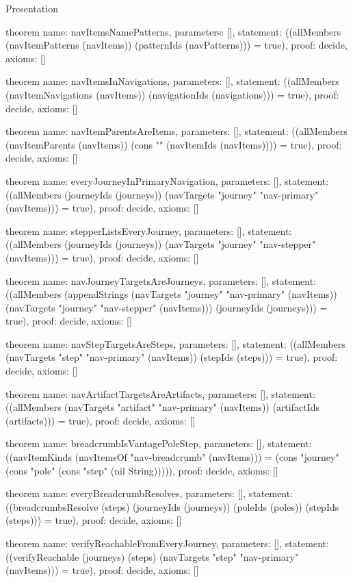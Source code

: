 \begin{lexlean}{Presentation}
\begin{semanticmodule}
theorem{
  name: navItemsNamePatterns,
  parameters: [],
  statement: ((allMembers (navItemPatterns (navItems)) (patternIds (navPatterns))) = true),
  proof: decide{},
  axioms: []
}

theorem{
  name: navItemsInNavigations,
  parameters: [],
  statement: ((allMembers (navItemNavigations (navItems)) (navigationIds (navigations))) = true),
  proof: decide{},
  axioms: []
}

theorem{
  name: navItemParentsAreItems,
  parameters: [],
  statement: ((allMembers (navItemParents (navItems)) (cons "" (navItemIds (navItems)))) = true),
  proof: decide{},
  axioms: []
}

theorem{
  name: everyJourneyInPrimaryNavigation,
  parameters: [],
  statement: ((allMembers (journeyIds (journeys)) (navTargets "journey" "nav-primary" (navItems))) = true),
  proof: decide{},
  axioms: []
}

theorem{
  name: stepperListsEveryJourney,
  parameters: [],
  statement: ((allMembers (journeyIds (journeys)) (navTargets "journey" "nav-stepper" (navItems))) = true),
  proof: decide{},
  axioms: []
}

theorem{
  name: navJourneyTargetsAreJourneys,
  parameters: [],
  statement: ((allMembers (appendStrings (navTargets "journey" "nav-primary" (navItems)) (navTargets "journey" "nav-stepper" (navItems))) (journeyIds (journeys))) = true),
  proof: decide{},
  axioms: []
}

theorem{
  name: navStepTargetsAreSteps,
  parameters: [],
  statement: ((allMembers (navTargets "step" "nav-primary" (navItems)) (stepIds (steps))) = true),
  proof: decide{},
  axioms: []
}

theorem{
  name: navArtifactTargetsAreArtifacts,
  parameters: [],
  statement: ((allMembers (navTargets "artifact" "nav-primary" (navItems)) (artifactIds (artifacts))) = true),
  proof: decide{},
  axioms: []
}

theorem{
  name: breadcrumbIsVantagePoleStep,
  parameters: [],
  statement: ((navItemKinds (navItemsOf "nav-breadcrumb" (navItems))) = (cons "journey" (cons "pole" (cons "step" (nil String))))),
  proof: decide{},
  axioms: []
}

theorem{
  name: everyBreadcrumbResolves,
  parameters: [],
  statement: ((breadcrumbsResolve (steps) (journeyIds (journeys)) (poleIds (poles)) (stepIds (steps))) = true),
  proof: decide{},
  axioms: []
}

theorem{
  name: verifyReachableFromEveryJourney,
  parameters: [],
  statement: ((verifyReachable (journeys) (steps) (navTargets "step" "nav-primary" (navItems))) = true),
  proof: decide{},
  axioms: []
}


\end{semanticmodule}
\end{lexlean}

